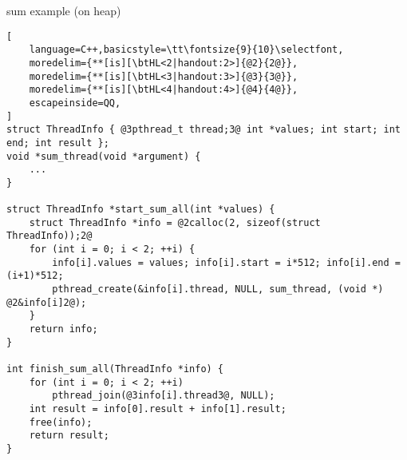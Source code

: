 \begin{frame}[fragile,label=sumAllHeap]{sum example (on heap)}
\begin{lstlisting}[
    language=C++,basicstyle=\tt\fontsize{9}{10}\selectfont,
    moredelim={**[is][\btHL<2|handout:2>]{@2}{2@}},
    moredelim={**[is][\btHL<3|handout:3>]{@3}{3@}},
    moredelim={**[is][\btHL<4|handout:4>]{@4}{4@}},
    escapeinside=QQ,
]
struct ThreadInfo { @3pthread_t thread;3@ int *values; int start; int end; int result };
void *sum_thread(void *argument) {
    ...
}

struct ThreadInfo *start_sum_all(int *values) {
    struct ThreadInfo *info = @2calloc(2, sizeof(struct ThreadInfo));2@
    for (int i = 0; i < 2; ++i) {
        info[i].values = values; info[i].start = i*512; info[i].end = (i+1)*512;
        pthread_create(&info[i].thread, NULL, sum_thread, (void *) @2&info[i]2@);
    }
    return info;
}

int finish_sum_all(ThreadInfo *info) {
    for (int i = 0; i < 2; ++i)
        pthread_join(@3info[i].thread3@, NULL);
    int result = info[0].result + info[1].result;
    free(info);
    return result;
}
\end{lstlisting}
\end{frame}

